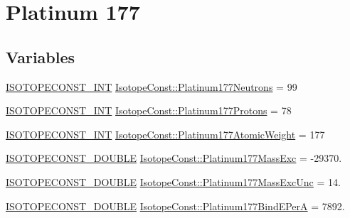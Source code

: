 \hypertarget{group___isotope_const-_platinum-_pt177}{}\section{Platinum 177}
\label{group___isotope_const-_platinum-_pt177}
\subsection*{Variables}
\begin{DoxyCompactItemize}
\item 
\mbox{\hyperlink{group___isotope_const-_macros_ga5f18360b3e99483a35c32d789e62621c}{I\+S\+O\+T\+O\+P\+E\+C\+O\+N\+S\+T\+\_\+\+I\+NT}} \mbox{\hyperlink{group___isotope_const-_platinum-_pt177_ga8fc8e184a34575f93d9ce1f66837faae}{Isotope\+Const\+::\+Platinum177\+Neutrons}} = 99
\item 
\mbox{\hyperlink{group___isotope_const-_macros_ga5f18360b3e99483a35c32d789e62621c}{I\+S\+O\+T\+O\+P\+E\+C\+O\+N\+S\+T\+\_\+\+I\+NT}} \mbox{\hyperlink{group___isotope_const-_platinum-_pt177_gaae8d7df04be34894630fa19b7f3f17fc}{Isotope\+Const\+::\+Platinum177\+Protons}} = 78
\item 
\mbox{\hyperlink{group___isotope_const-_macros_ga5f18360b3e99483a35c32d789e62621c}{I\+S\+O\+T\+O\+P\+E\+C\+O\+N\+S\+T\+\_\+\+I\+NT}} \mbox{\hyperlink{group___isotope_const-_platinum-_pt177_gaabae0734cbf7451a107ced14bc70a4b2}{Isotope\+Const\+::\+Platinum177\+Atomic\+Weight}} = 177
\item 
\mbox{\hyperlink{group___isotope_const-_macros_ga8f45a7272ce02c0b4c65c44636ed719a}{I\+S\+O\+T\+O\+P\+E\+C\+O\+N\+S\+T\+\_\+\+D\+O\+U\+B\+LE}} \mbox{\hyperlink{group___isotope_const-_platinum-_pt177_ga1259077c8e73c0061dbdaef19f660cff}{Isotope\+Const\+::\+Platinum177\+Mass\+Exc}} = -\/29370.
\item 
\mbox{\hyperlink{group___isotope_const-_macros_ga8f45a7272ce02c0b4c65c44636ed719a}{I\+S\+O\+T\+O\+P\+E\+C\+O\+N\+S\+T\+\_\+\+D\+O\+U\+B\+LE}} \mbox{\hyperlink{group___isotope_const-_platinum-_pt177_ga3ef79986b51c4b9887ed40c27a7f62d1}{Isotope\+Const\+::\+Platinum177\+Mass\+Exc\+Unc}} = 14.
\item 
\mbox{\hyperlink{group___isotope_const-_macros_ga8f45a7272ce02c0b4c65c44636ed719a}{I\+S\+O\+T\+O\+P\+E\+C\+O\+N\+S\+T\+\_\+\+D\+O\+U\+B\+LE}} \mbox{\hyperlink{group___isotope_const-_platinum-_pt177_gaa99dc532bad05d286f688795d70cb295}{Isotope\+Const\+::\+Platinum177\+Bind\+E\+PerA}} = 7892.
\item 

\end{DoxyCompactItemize}
